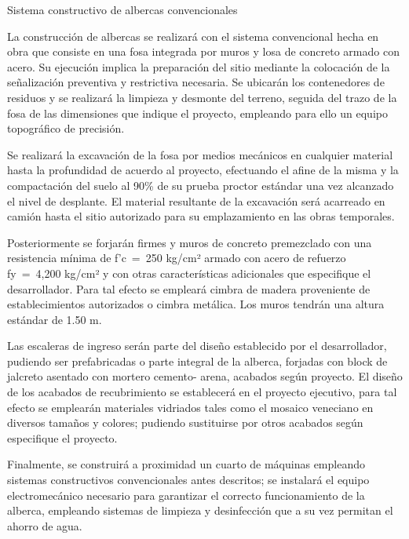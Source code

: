 \documentclass{article}
\begin{document}
\bigskip


\bigskip

Sistema constructivo de albercas convencionales


\bigskip

La construcción de albercas se realizará con el sistema convencional hecha en obra que consiste en una fosa integrada por muros y losa de concreto armado con acero. Su ejecución implica la preparación del sitio mediante la colocación de la señalización preventiva y restrictiva necesaria. Se ubicarán los contenedores de residuos y se realizará la limpieza y desmonte del terreno, seguida del trazo de la fosa de las dimensiones que indique el proyecto, empleando para ello un equipo topográfico de precisión. 


\bigskip

Se realizará la excavación de la fosa por medios mecánicos en cualquier material hasta la profundidad de acuerdo al proyecto, efectuando el afine de la misma y la compactación del suelo al 90\% de su prueba proctor estándar una vez alcanzado el nivel de desplante. El material resultante de la excavación será acarreado en camión hasta el sitio autorizado para su emplazamiento en las obras temporales.


\bigskip

Posteriormente se forjarán firmes y muros de concreto premezclado con una resistencia mínima de f’c~=~250 kg/cm² armado con acero de refuerzo fy~=~4,200 kg/cm² y con otras características adicionales que especifique el desarrollador. Para tal efecto se empleará cimbra de madera proveniente de establecimientos autorizados o cimbra metálica. Los muros tendrán una altura estándar de 1.50 m.


\bigskip

Las escaleras de ingreso serán parte del diseño establecido por el desarrollador, pudiendo ser prefabricadas o parte integral de la alberca, forjadas con block de jalcreto asentado con mortero cemento- arena, acabados según proyecto. El diseño de los acabados de recubrimiento se establecerá en el proyecto ejecutivo, para tal efecto se emplearán materiales vidriados tales como el mosaico veneciano en diversos tamaños y colores; pudiendo sustituirse por otros acabados según especifique el proyecto. 


\bigskip

Finalmente, se construirá a proximidad un cuarto de máquinas empleando sistemas constructivos convencionales antes descritos; se instalará el equipo electromecánico necesario para garantizar el correcto funcionamiento de la alberca, empleando sistemas de limpieza y desinfección que a su vez permitan el ahorro de agua.
\end{document}
